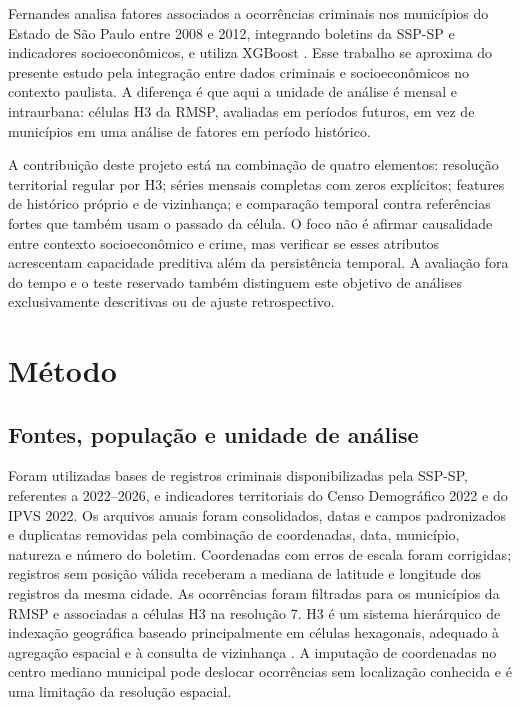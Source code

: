 \documentclass[12pt]{article}
\begin{document}
Fernandes analisa fatores associados a ocorrências criminais nos municípios do Estado de São Paulo entre 2008 e 2012, integrando boletins da SSP-SP e indicadores socioeconômicos, e utiliza XGBoost \cite{fernandes2025tese}. Esse trabalho se aproxima do presente estudo pela integração entre dados criminais e socioeconômicos no contexto paulista. A diferença é que aqui a unidade de análise é mensal e intraurbana: células H3 da RMSP, avaliadas em períodos futuros, em vez de municípios em uma análise de fatores em período histórico.

A contribuição deste projeto está na combinação de quatro elementos: resolução territorial regular por H3; séries mensais completas com zeros explícitos; features de histórico próprio e de vizinhança; e comparação temporal contra referências fortes que também usam o passado da célula. O foco não é afirmar causalidade entre contexto socioeconômico e crime, mas verificar se esses atributos acrescentam capacidade preditiva além da persistência temporal. A avaliação fora do tempo e o teste reservado também distinguem este objetivo de análises exclusivamente descritivas ou de ajuste retrospectivo.

\section{Método}

\subsection{Fontes, população e unidade de análise}

Foram utilizadas bases de registros criminais disponibilizadas pela SSP-SP, referentes a 2022--2026, e indicadores territoriais do Censo Demográfico 2022 e do IPVS 2022. Os arquivos anuais foram consolidados, datas e campos padronizados e duplicatas removidas pela combinação de coordenadas, data, município, natureza e número do boletim. Coordenadas com erros de escala foram corrigidas; registros sem posição válida receberam a mediana de latitude e longitude dos registros da mesma cidade. As ocorrências foram filtradas para os municípios da RMSP e associadas a células H3 na resolução 7. H3 é um sistema hierárquico de indexação geográfica baseado principalmente em células hexagonais, adequado à agregação espacial e à consulta de vizinhança \cite{uber_h3}. A imputação de coordenadas no centro mediano municipal pode deslocar ocorrências sem localização conhecida e é uma limitação da resolução espacial.
\end{document}
